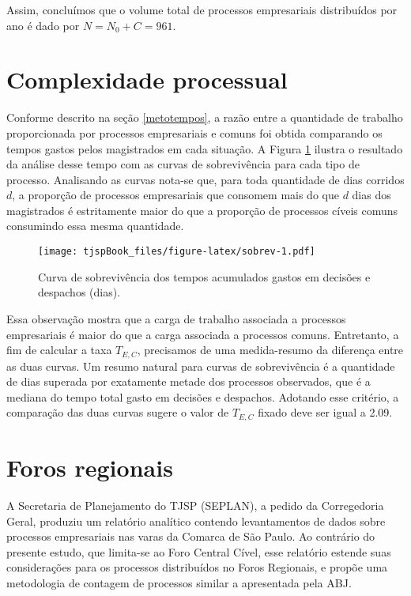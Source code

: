 \documentclass[]{book}
\begin{document}
Assim, concluímos que o volume total de processos empresariais
distribuídos por ano é dado por \(N = N_0 + C = 961.\)

\section{Complexidade processual}\label{tempos}

Conforme descrito na seção \ref{metotempos}, a razão entre a quantidade
de trabalho proporcionada por processos empresariais e comuns foi obtida
comparando os tempos gastos pelos magistrados em cada situação. A Figura
\ref{fig:sobrev} ilustra o resultado da análise desse tempo com as
curvas de sobrevivência para cada tipo de processo. Analisando as curvas
nota-se que, para toda quantidade de dias corridos \(d\), a proporção de
processos empresariais que consomem mais do que \(d\) dias dos
magistrados é estritamente maior do que a proporção de processos cíveis
comuns consumindo essa mesma quantidade.

\begin{figure}[htbp]
\centering
\texttt{[image: tjspBook\_files/figure-latex/sobrev-1.pdf]}
\caption{\label{fig:sobrev}Curva de sobrevivência dos tempos acumulados
gastos em decisões e despachos (dias).}
\end{figure}

Essa observação mostra que a carga de trabalho associada a processos
empresariais é maior do que a carga associada a processos comuns.
Entretanto, a fim de calcular a taxa \(T_{E,C}\), precisamos de uma
medida-resumo da diferença entre as duas curvas. Um resumo natural para
curvas de sobrevivência é a quantidade de dias superada por exatamente
metade dos processos observados, que é a mediana do tempo total gasto em
decisões e despachos. Adotando esse critério, a comparação das duas
curvas sugere o valor de \(T_{E,C}\) fixado deve ser igual a 2.09.

\section{Foros regionais}\label{regionais}

A Secretaria de Planejamento do TJSP (SEPLAN), a pedido da Corregedoria
Geral, produziu um relatório analítico contendo levantamentos de dados
sobre processos empresariais nas varas da Comarca de São Paulo. Ao
contrário do presente estudo, que limita-se ao Foro Central Cível, esse
relatório estende suas considerações para os processos distribuídos no
Foros Regionais, e propõe uma metodologia de contagem de processos
similar a apresentada pela ABJ.
\end{document}
